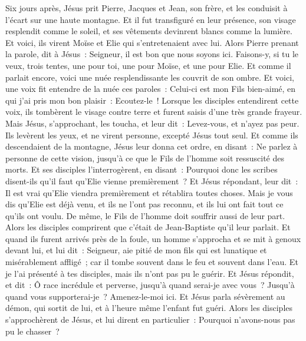 \begin{multicols}{2}
\VerseOne{}Six jours après, Jésus prit Pierre, Jacques et Jean, son frère, et les conduisit à l'écart sur une haute montagne.
Et il fut transfiguré en leur présence, son visage resplendit comme le soleil, et ses vêtements devinrent blancs comme la lumière.
Et voici, ils virent Moïse et Elie qui s'entretenaient avec lui.
Alors Pierre prenant la parole, dit à Jésus~: Seigneur, il est bon que nous soyons ici. Faisons-y, si tu le veux, trois tentes, une pour toi, une pour Moïse, et une pour Elie.
Et comme il parlait encore, voici une nuée resplendissante les couvrit de son ombre. Et voici, une voix fit entendre de la nuée ces paroles~: Celui-ci est mon Fils bien-aimé, en qui j'ai pris mon bon plaisir~: Ecoutez-le~!
Lorsque les disciples entendirent cette voix, ils tombèrent le visage contre terre et furent saisis d'une très grande frayeur.
Mais Jésus, s'approchant, les toucha, et leur dit~: Levez-vous, et n'ayez pas peur.
Ils levèrent les yeux, et ne virent personne, excepté Jésus tout seul.
Et comme ils descendaient de la montagne, Jésus leur donna cet ordre, en disant~: Ne parlez à personne de cette vision, jusqu'à ce que le Fils de l'homme soit ressuscité des morts.
Et ses disciples l'interrogèrent, en disant~: Pourquoi donc les scribes disent-ils qu'il faut qu'Elie vienne premièrement~?
Et Jésus répondant, leur dit~: Il est vrai qu'Elie viendra premièrement et rétablira toutes choses.
Mais je vous dis qu'Elie est déjà venu, et ils ne l'ont pas reconnu, et ils lui ont fait tout ce qu'ils ont voulu. De même, le Fils de l'homme doit souffrir aussi de leur part.
Alors les disciples comprirent que c'était de Jean-Baptiste qu'il leur parlait.
Et quand ils furent arrivés près de la foule, un homme s'approcha et se mit à genoux devant lui,
et lui dit~: Seigneur, aie pitié de mon fils qui est lunatique et misérablement affligé~; car il tombe souvent dans le feu et souvent dans l'eau.
Et je l'ai présenté à tes disciples, mais ils n'ont pas pu le guérir.
Et Jésus répondit, et dit~: Ô race incrédule et perverse, jusqu'à quand serai-je avec vous~? Jusqu'à quand vous supporterai-je~? Amenez-le-moi ici.
Et Jésus parla sévèrement au démon, qui sortit de lui, et à l'heure même l'enfant fut guéri.
Alors les disciples s'approchèrent de Jésus, et lui dirent en particulier~: Pourquoi n'avons-nous pas pu le chasser~?

\end{multicols}
